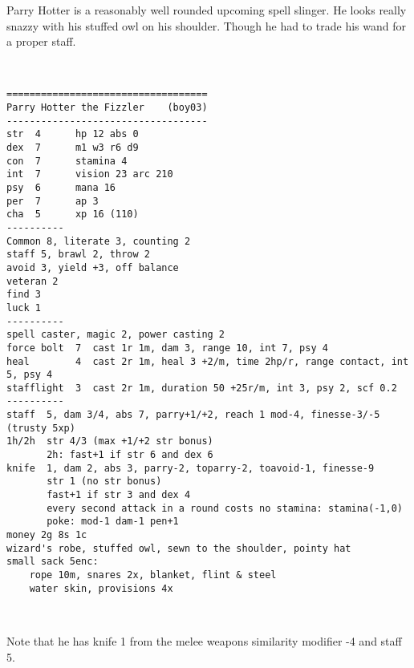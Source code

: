 \clearpage
\begin{samepage}

\noindent Parry Hotter is a reasonably well rounded upcoming spell slinger. He looks really snazzy with his stuffed owl on his shoulder. Though he had to trade his wand for a proper staff.

\

\small \begin{verbatim}
===================================
Parry Hotter the Fizzler    (boy03)
-----------------------------------
str  4      hp 12 abs 0
dex  7      m1 w3 r6 d9
con  7      stamina 4
int  7      vision 23 arc 210
psy  6      mana 16
per  7      ap 3
cha  5      xp 16 (110)
----------
Common 8, literate 3, counting 2
staff 5, brawl 2, throw 2
avoid 3, yield +3, off balance
veteran 2
find 3
luck 1
----------
spell caster, magic 2, power casting 2
force bolt  7  cast 1r 1m, dam 3, range 10, int 7, psy 4
heal        4  cast 2r 1m, heal 3 +2/m, time 2hp/r, range contact, int 5, psy 4
stafflight  3  cast 2r 1m, duration 50 +25r/m, int 3, psy 2, scf 0.2
----------
staff  5, dam 3/4, abs 7, parry+1/+2, reach 1 mod-4, finesse-3/-5   (trusty 5xp)
1h/2h  str 4/3 (max +1/+2 str bonus)
       2h: fast+1 if str 6 and dex 6
knife  1, dam 2, abs 3, parry-2, toparry-2, toavoid-1, finesse-9
       str 1 (no str bonus)
       fast+1 if str 3 and dex 4
       every second attack in a round costs no stamina: stamina(-1,0)
       poke: mod-1 dam-1 pen+1
money 2g 8s 1c
wizard's robe, stuffed owl, sewn to the shoulder, pointy hat
small sack 5enc:
    rope 10m, snares 2x, blanket, flint & steel
    water skin, provisions 4x
\end{verbatim} \end{samepage} \normalsize

\

\noindent Note that he has knife 1 from the melee weapons similarity modifier -4 and staff 5.






